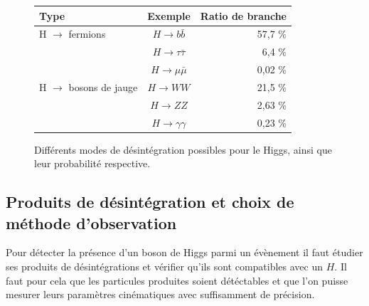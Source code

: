 \documentclass[11pt]{article} %
\begin{document}
\begin{figure}[H]
\centering
\begin{tabular}{|l|c|r|} 
   \hline
   Type & Exemple & Ratio de branche\\
    \hline
    H $\to$ fermions & $H \to b\bar{b} $ & 57,7 \% \\
    \cline{2-3} 
        & $H \to \tau\bar{\tau} $ & 6,4 \% \\
   \cline{2-3} 
        & $H \to \mu\bar{\mu}$ & 0,02 \%\\
    \hline
  H $\to$ bosons de jauge & $H \to WW$ &21,5 \% \\
   \cline{2-3}
     & $H \to ZZ$ & 2,63 \% \\
   \cline{2-3}
      & $H \to \gamma \gamma$ & 0,23 \% \\
  \hline
\end{tabular}
\caption{Différents modes de désintégration possibles pour le Higgs, ainsi que leur probabilité respective. }
\end{figure}

\subsection{Produits de désintégration et choix de méthode d'observation}

Pour détecter la présence d'un boson de Higgs parmi un évènement il faut étudier ses produits de désintégrations et vérifier qu'ils sont compatibles avec un $H$. Il faut pour cela que les particules produites soient détéctables et que l'on puisse mesurer leurs paramètres cinématiques avec suffisamment de précision.
\end{document}
